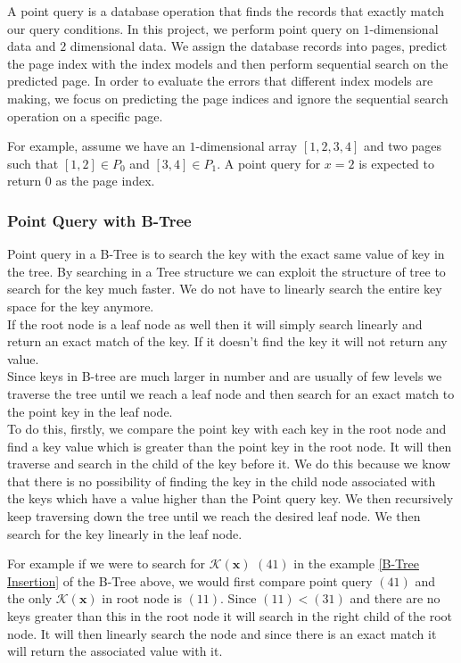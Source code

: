 A point query is a database operation that finds the records that exactly match our query conditions. In this project, we perform point query on $1$-dimensional data and $2$ dimensional data. We assign the database records into pages, predict the page index with the index models and then perform sequential search on the predicted page. In order to evaluate the errors that different index models are making, we focus on predicting the page indices and ignore the sequential search operation on a specific page. 

\begin{mscexample}
For example, assume we have an $1$-dimensional array $[1,2,3,4]$ and two pages such that $[1,2]\in P_0$ and $[3,4]\in P_1$. A point query for $x=2$ is expected to return 0 as the page index.
\end{mscexample}

\subsubsection{Point Query with B-Tree}

Point query in a B-Tree is to search the key with the exact same value of key in the tree. By searching in a Tree structure we can exploit the structure of tree to search for the key much faster. We do not have to linearly search the entire key space for the key anymore.\\
If the root node is a leaf node as well then it will simply search linearly and return an exact match of the key. If it doesn't find the key it will not return any value.\\
Since keys in B-tree are much larger in number and are usually of few levels we traverse the tree until we reach a leaf node and then search for an exact match to the point key in the leaf node. \\
To do this, firstly, we compare the point key with each key in the root node and find a key value which is greater than the point key in the root node. It will then traverse and search in the child of the key before it. We do this because we know that there is no possibility of finding the key in the child node associated with the keys which have a value higher than the Point query key. We then recursively keep traversing down the tree until we reach the desired leaf node. We then search for the key linearly in the leaf node.

\begin{mscexample}
For example if we were to search for $\mathcal{K}(\boldsymbol{x})$ $(41)$ in the example \ref{B-Tree Insertion} of the B-Tree above, we would first compare point query $(41)$ and the only $\mathcal{K}(\boldsymbol{x})$ in root node is $(11)$. Since $(11) < (31)$ and there are no keys greater than this in the root node it will search in the right child of the root node. It will then linearly search the node and since there is an exact match it will return the associated value with it.
\end{mscexample}


